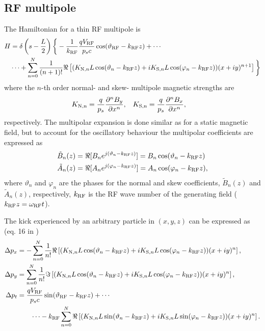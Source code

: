 \documentclass[english]{article}
\begin{document}
\subsection{RF multipole}
The Hamiltonian for a thin RF multipole is
\begin{align}
    H &= \delta\left(s-\frac{L}{2}\right) \bigg\{-\frac{1}{k_{\rm RF}}
    \frac{qV_{\rm RF}}{p_s c}\cos(\vartheta_{\rm RF}-k_{\rm RF}z) + \cdots \\
    &\cdots+ \sum_{n=0}^N \frac{1}{(n+1)!}\Re\left[(K_{\text{N},n}L
    \cos(\vartheta_n-k_{\rm RF}z)+iK_{\text{S},n}L\cos(\varphi_n-k_{\rm RF}z))
    (x+iy)^{n+1}\right]\bigg\}
\end{align}
where the $n$-th order normal- and skew- multipole magnetic strengths are
\begin{align}
    K_{\rm N,n} &= \frac{q}{p_s} \frac{\partial^n B_y}{\partial x^n},
    & K_{\rm S,n} &= \frac{q}{p_s} \frac{\partial^n B_x}{\partial x^n},
\end{align}
respectively. The multipolar expansion is done similar as for a static
magnetic field, but to account for the oscillatory behaviour the multipolar
coefficients are expressed as
\begin{align}
    \tilde{B}_n(z)&=\Re[B_ne^{j(\vartheta_n-k_{\rm RF}z)}]=B_n\cos(\vartheta_n-k_{\rm RF}z)\\
    \tilde{A}_n(z)&=\Re[A_ne^{j(\varphi_n-k_{\rm RF}z)}]=A_n\cos(\varphi_n-k_{\rm RF}z),
\end{align}
where $\vartheta_n$ and $\varphi_n$ are the phases for the normal and skew
coefficients, $\tilde{B}_n(z)$ and $\tilde{A}_n(z)$, respectively, $k_{\rm
RF}$ is the RF wave number of the generating field ($k_{\rm RF}z=\omega_{\rm
RF}t$).

The kick experienced by an arbitrary particle in $(x,y,z)$ can be expressed as
(eq. 16 in \cite{rf_multipoles})
\begin{align}
    \Delta p_x &= -\sum_{n=0}^N \frac{1}{n!} \Re\left[(K_{\text{N},n}L\cos(\vartheta_n
    -k_{\rm RF}z) + iK_{\text{S},n}L\cos(\varphi_n-k_{\rm RF}z))(x+iy)^n\right], \\
    \Delta p_y &= \sum_{n=0}^N \frac{1}{n!} \Im\left[(K_{\text{N},n}L\cos(\vartheta_n
    -k_{\rm RF}z) + iK_{\text{S},n}L\cos(\varphi_n-k_{\rm RF}z))(x+iy)^n\right], \\
    \Delta p_t &= \frac{qV_{\rm RF}}{p_sc}\sin(\vartheta_{\rm RF}-k_{\rm RF}z)+\cdots \\
    & \qquad\cdots - k_{\rm RF}\sum_{n=0}^N \Re\left[(K_{\text{N},n}L\sin(\vartheta_n
    -k_{\rm RF}z) + iK_{\text{S},n}L\sin(\varphi_n-k_{\rm RF}z))(x+iy)^n\right].
\end{align}
\end{document}
